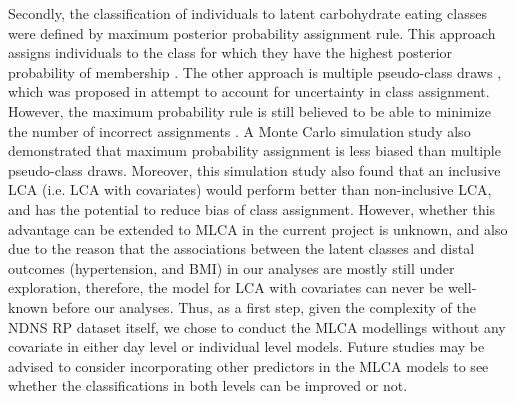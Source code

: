 Secondly, the classification of individuals to latent carbohydrate eating classes were defined by maximum posterior probability assignment rule. This approach assigns individuals to the class for which they have the highest posterior probability of membership \parencite{nagin2005group}. The other approach is multiple pseudo-class draws \parencite{wang2005residual}, which was proposed in attempt to account for uncertainty in class assignment. However, the maximum probability rule is still believed to be able to minimize the number of incorrect assignments \parencite{goodman20071}. A Monte Carlo simulation study \parencite{bray2015eliminating} also demonstrated that maximum probability assignment is less biased than multiple pseudo-class draws. Moreover, this simulation study also found that an inclusive LCA (i.e. LCA with covariates) would perform better than non-inclusive LCA, and has the potential to reduce bias of class assignment. However, whether this advantage can be extended to MLCA in the current project is unknown, and also due to the reason that the associations between the latent classes and distal outcomes (hypertension, and BMI) in our analyses are mostly still under exploration, therefore, the model for LCA with covariates can never be well-known before our analyses. Thus, as a first step, given the complexity of the NDNS RP dataset itself, we chose to conduct the MLCA modellings without any covariate in either day level or individual level models. Future studies may be advised to consider incorporating other predictors in the MLCA models to see whether the classifications in both levels can be improved or not. 

